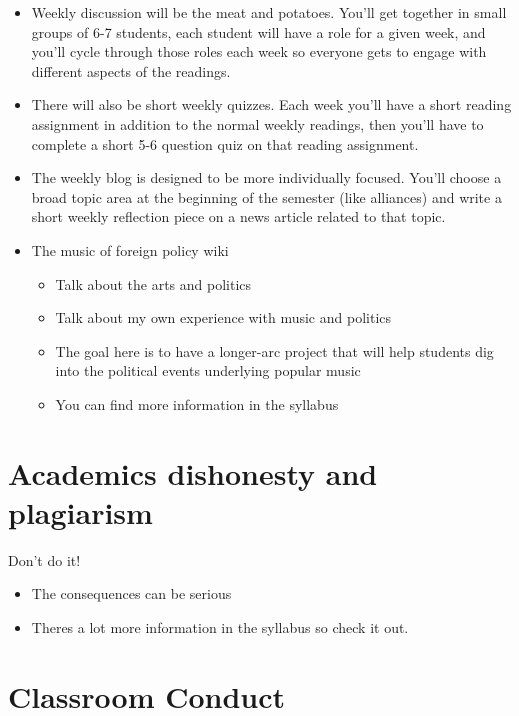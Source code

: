 \documentclass[
  12pt,
]{article}
\begin{document}
\begin{itemize}
\item
  Weekly discussion will be the meat and potatoes. You'll get together
  in small groups of 6-7 students, each student will have a role for a
  given week, and you'll cycle through those roles each week so everyone
  gets to engage with different aspects of the readings.
\item
  There will also be short weekly quizzes. Each week you'll have a short
  reading assignment in addition to the normal weekly readings, then
  you'll have to complete a short 5-6 question quiz on that reading
  assignment.
\item
  The weekly blog is designed to be more individually focused. You'll
  choose a broad topic area at the beginning of the semester (like
  alliances) and write a short weekly reflection piece on a news article
  related to that topic.
\item
  The music of foreign policy wiki

  \begin{itemize}
  \item
    Talk about the arts and politics
  \item
    Talk about my own experience with music and politics
  \item
    The goal here is to have a longer-arc project that will help
    students dig into the political events underlying popular music
  \item
    You can find more information in the syllabus
  \end{itemize}
\end{itemize}

\hypertarget{academics-dishonesty-and-plagiarism}{%
\section{Academics dishonesty and
plagiarism}\label{academics-dishonesty-and-plagiarism}}

Don't do it!

\begin{itemize}
\item
  The consequences can be serious
\item
  Theres a lot more information in the syllabus so check it out.
\end{itemize}

\hypertarget{classroom-conduct}{%
\section{Classroom Conduct}\label{classroom-conduct}}
\end{document}
